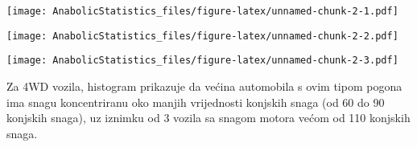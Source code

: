 \documentclass[
]{article}
\newenvironment{Shaded}{\begin{snugshade}}{\end{snugshade}}
\newcommand{\AttributeTok}[1]{\textcolor[rgb]{0.13,0.29,0.53}{#1}}
\newcommand{\CommentTok}[1]{\textcolor[rgb]{0.56,0.35,0.01}{\textit{#1}}}
\newcommand{\FunctionTok}[1]{\textcolor[rgb]{0.13,0.29,0.53}{\textbf{#1}}}
\newcommand{\NormalTok}[1]{#1}
\newcommand{\SpecialCharTok}[1]{\textcolor[rgb]{0.81,0.36,0.00}{\textbf{#1}}}
\newcommand{\StringTok}[1]{\textcolor[rgb]{0.31,0.60,0.02}{#1}}
\begin{document}
\begin{Shaded}
\end{Shaded}

\texttt{[image: AnabolicStatistics\_files/figure-latex/unnamed-chunk-2-1.pdf]}

\begin{Shaded}
\end{Shaded}

\texttt{[image: AnabolicStatistics\_files/figure-latex/unnamed-chunk-2-2.pdf]}

\begin{Shaded}
\end{Shaded}

\texttt{[image: AnabolicStatistics\_files/figure-latex/unnamed-chunk-2-3.pdf]}

Za 4WD vozila, histogram prikazuje da većina automobila s ovim tipom
pogona ima snagu koncentriranu oko manjih vrijednosti konjskih snaga (od
60 do 90 konjskih snaga), uz iznimku od 3 vozila sa snagom motora većom
od 110 konjskih snaga.
\end{document}
